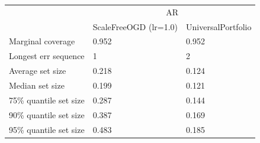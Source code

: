 \begin{tabular}{lll}
\toprule
& \multicolumn{2}{c}{AR} \\
& ScaleFreeOGD (lr=1.0) & UniversalPortfolio \\
\midrule
Marginal coverage & 0.952 & 0.952 \\
Longest err sequence & 1 & 2 \\
Average set size & 0.218 & 0.124 \\
Median set size & 0.199 & 0.121 \\
75\% quantile set size & 0.287 & 0.144 \\
90\% quantile set size & 0.387 & 0.169 \\
95\% quantile set size & 0.483 & 0.185 \\
\bottomrule
\end{tabular}
